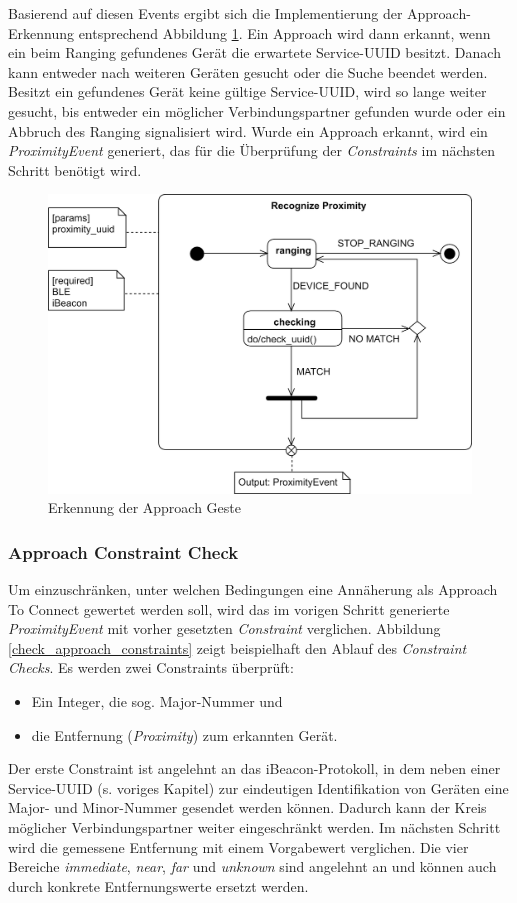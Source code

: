 {Basierend auf diesen Events ergibt sich die Implementierung der Approach-Erkennung entsprechend Abbildung \ref{recognize_approach}. Ein Approach wird dann erkannt, wenn ein beim Ranging gefundenes Gerät die erwartete Service-UUID besitzt. Danach kann entweder nach weiteren Geräten gesucht oder die Suche beendet werden. Besitzt ein gefundenes Gerät keine gültige Service-UUID, wird so lange weiter gesucht, bis entweder ein möglicher Verbindungspartner gefunden wurde oder ein Abbruch des Ranging signalisiert wird. Wurde ein Approach erkannt, wird ein \textit{ProximityEvent} generiert, das für die Überprüfung der \textit{Constraints} im nächsten Schritt benötigt wird.

\begin{figure}[h]
\includegraphics[width=\textwidth]{approach_recognize.png}
\caption{Erkennung der Approach Geste}
\label{recognize_approach}
\end{figure}

\subsubsection*{Approach Constraint Check}
Um einzuschränken, unter welchen Bedingungen eine Annäherung als Approach To Connect gewertet werden soll, wird das im vorigen Schritt generierte \textit{ProximityEvent} mit vorher gesetzten \textit{Constraint} verglichen. Abbildung \ref{check_approach_constraints} zeigt beispielhaft den Ablauf des \textit{Constraint Checks}. Es werden zwei Constraints überprüft:
\begin{itemize}
\item Ein Integer, die sog. Major-Nummer und
\item die Entfernung (\textit{Proximity}) zum erkannten Gerät.
\end{itemize}
Der erste Constraint ist angelehnt an das iBeacon-Protokoll, in dem neben einer Service-UUID (s. voriges Kapitel) zur eindeutigen Identifikation von Geräten eine Major- und Minor-Nummer gesendet werden können. Dadurch kann der Kreis möglicher Verbindungspartner weiter eingeschränkt werden.
Im nächsten Schritt wird die gemessene Entfernung mit einem Vorgabewert verglichen. Die vier Bereiche \textit{immediate}, \textit{near}, \textit{far} und \textit{unknown} sind angelehnt an \cite{Marquardt2015} und können auch durch konkrete Entfernungswerte ersetzt werden.\\

}
